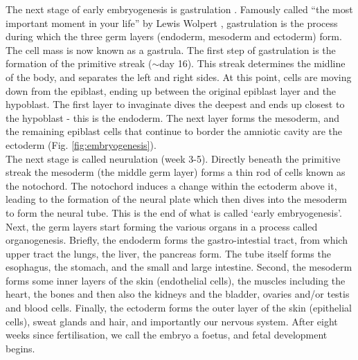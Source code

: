 The next stage of early embryogenesis is gastrulation \cite{sheng2015epiblast}.
Famously called “the most important moment in your life” by Lewis Wolpert \cite{wolpert2015interview}, gastrulation is the process during which the three germ layers (endoderm, mesoderm and ectoderm) form.
The cell mass is now known as a gastrula.
The first step of gastrulation is the formation of the primitive streak ($\sim$day 16).
This streak determines the midline of the body, and separates the left and right sides.
At this point, cells are moving down from the epiblast, ending up between the original epiblast layer and the hypoblast.
The first layer to invaginate dives the deepest and ends up closest to the hypoblast - this is the endoderm.
The next layer forms the mesoderm, and the remaining epiblast cells that continue to border the amniotic cavity are the ectoderm (Fig. \ref{fig:embryogenesis}).\\

The next stage is called neurulation (week 3-5).
Directly beneath the primitive streak the mesoderm (the middle germ layer) forms a thin rod of cells known as the notochord.
The notochord induces a change within the ectoderm above it, leading to the formation of the neural plate which then dives into the mesoderm to form the neural tube.
This is the end of what is called `early embryogenesis'.\\

Next, the germ layers start forming the various organs in a process called organogenesis.
Briefly, the endoderm forms the gastro-intestial tract, from which upper tract the lungs, the liver, the pancreas form. 
The tube itself forms the esophagus, the stomach, and the small and large intestine.
Second, the mesoderm forms some inner layers of the skin (endothelial cells), the muscles including the heart, the bones and then also the kidneys and the bladder, ovaries and/or testis and blood cells.
Finally, the ectoderm forms the outer layer of the skin (epithelial cells), sweat glands and hair, and importantly our nervous system.
After eight weeks since fertilisation, we call the embryo a foetus, and fetal development begins.



